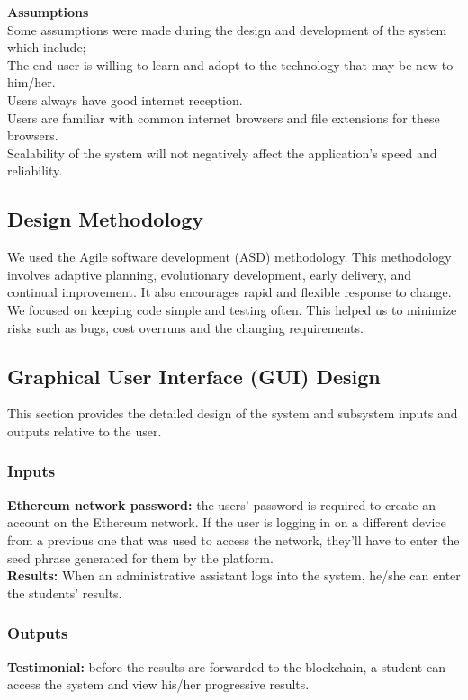 \textbf{Assumptions}\\
Some assumptions were made during the design and development of the system which include;\\

The end-user is willing to learn and adopt to the technology that may be new to him/her.\\

Users always have good internet reception.\\

Users are familiar with common internet browsers and file extensions for these browsers.\\

Scalability of the system will not negatively affect the application’s speed and reliability.\\

\subsection{Design Methodology}
We used the Agile software development (ASD) methodology. This methodology involves adaptive planning, evolutionary development, early delivery, and continual improvement. It also encourages rapid and flexible response to change. We focused on keeping code simple and testing often. This helped us to minimize risks such as bugs, cost overruns and the changing requirements.

\subsection{Graphical User Interface (GUI) Design}
This section provides the detailed design of the system and subsystem inputs and outputs relative to the user.

\subsubsection{Inputs}
\textbf{Ethereum network password:} the users’ password is required to create an account on the Ethereum network.  If the user is logging in on a different device from a previous one that was used to access the network, they’ll have to enter the seed phrase generated for them by the platform. \\

\textbf{Results:} When an administrative assistant logs into the system, he/she can enter the students’ results.

\subsubsection{Outputs}
\textbf{Testimonial:} before the results are forwarded to the blockchain, a student can access the system and view his/her progressive results.\\


